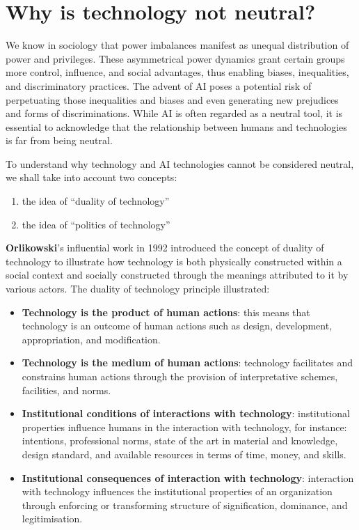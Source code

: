 \section{Why is technology not neutral?}

We know in sociology that power imbalances manifest as unequal distribution of power and privileges. These asymmetrical power dynamics grant certain groups more control, influence, and social advantages, thus enabling biases, inequalities, and discriminatory practices. The advent of AI poses a potential risk of perpetuating those inequalities and biases and even generating new prejudices and forms of discriminations. While AI is often regarded as a neutral tool, it is essential to acknowledge that the relationship between humans and technologies is far from being neutral.

To understand why technology and AI technologies cannot be considered neutral, we shall take into account two concepts: 
\begin{enumerate}
    \item the idea of “duality of technology” 
    \item the idea of “politics of technology”
\end{enumerate}

\textbf{Orlikowski}’s influential work in 1992 introduced the concept of duality of technology to illustrate how technology is both physically constructed within a social context and socially constructed through the meanings attributed to it by various actors. The duality of technology principle illustrated:
\begin{itemize}
    \item \textbf{Technology is the product of human actions}: this means that technology is an outcome of human actions such as design, development, appropriation, and modification.
    \item \textbf{Technology is the medium of human actions}: technology facilitates and constrains human actions through the provision of interpretative schemes, facilities, and norms.
    \item \textbf{Institutional conditions of interactions with technology}: institutional properties influence humans in the interaction with technology, for instance: intentions, professional norms, state of the art in material and knowledge, design standard, and available resources in terms of time, money, and skills.
    \item \textbf{Institutional consequences of interaction with technology}: interaction with technology influences the institutional properties of an organization through enforcing or transforming structure of signification, dominance, and legitimisation.
\end{itemize}

